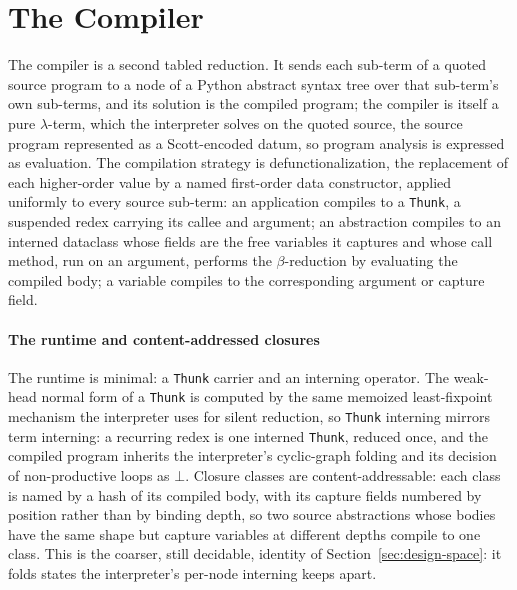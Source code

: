 \section{The Compiler}\label{app:compiler}
The compiler is a second tabled reduction. It sends each sub-term of a quoted source program to a node of a Python abstract syntax tree over that sub-term's own sub-terms, and its solution is the compiled program; the compiler is itself a pure $\lambda$-term, which the interpreter solves on the quoted source, the source program represented as a Scott-encoded datum, so program analysis is expressed as evaluation. The compilation strategy is defunctionalization, the replacement of each higher-order value by a named first-order data constructor, applied uniformly to every source sub-term: an application compiles to a \texttt{Thunk}, a suspended redex carrying its callee and argument; an abstraction compiles to an interned dataclass whose fields are the free variables it captures and whose call method, run on an argument, performs the $\beta$-reduction by evaluating the compiled body; a variable compiles to the corresponding argument or capture field.

\paragraph{The runtime and content-addressed closures}
The runtime is minimal: a \texttt{Thunk} carrier and an interning operator. The weak-head normal form of a \texttt{Thunk} is computed by the same memoized least-fixpoint mechanism the interpreter uses for silent reduction, so \texttt{Thunk} interning mirrors term interning: a recurring redex is one interned \texttt{Thunk}, reduced once, and the compiled program inherits the interpreter's cyclic-graph folding and its decision of non-productive loops as $\bot$. Closure classes are content-addressable: each class is named by a hash of its compiled body, with its capture fields numbered by position rather than by binding depth, so two source abstractions whose bodies have the same shape but capture variables at different depths compile to one class. This is the coarser, still decidable, identity of Section~\ref{sec:design-space}: it folds states the interpreter's per-node interning keeps apart.

